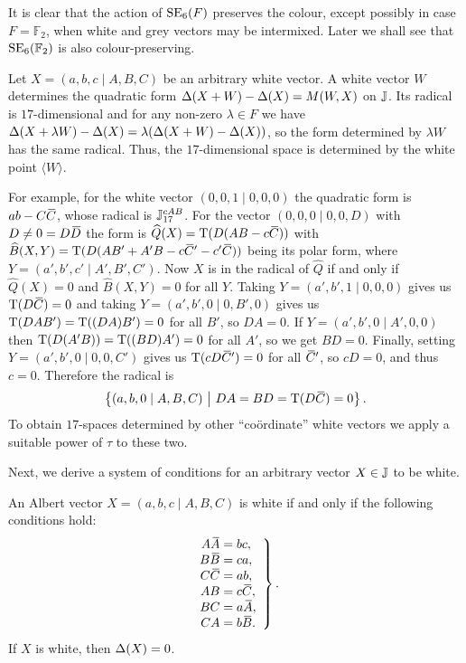 It is clear that the action of $\mathrm{SE}_6(F)$ preserves the colour, except possibly in case
$F = \mathbb{F}_2$, when white and grey vectors may be intermixed. 
Later we shall see that $\mathrm{SE}_6(\mathbb{F}_2)$ is also colour-preserving.

Let $X = (a,b,c\mid A,B,C)$ be an arbitrary white vector. 
A white vector $W$ determines the quadratic form $\Delta(X+W) - \Delta(X) = M(W,X)$ on $\mathbb{J}$. 
Its radical is $17$-dimensional and for any non-zero $\lambda \in F$ 
we have $\Delta(X+\lambda W) - \Delta(X) = \lambda( \Delta(X+W) - \Delta(X) )$, so 
the form determined by $\lambda W$ has the same radical. Thus, the $17$-dimensional
space is determined by the white point $\langle W \rangle$. 

For example, for the white vector $(0,0,1\mid 0,0,0)$ the quadratic form is 
$ab - C\mathord{\mbox{\hspace*{0pt}}\,\overline{\!C\!\!\;}\!\:}\mbox{\hspace*{0pt}}$, whose radical is $\mathbb{J}_{17}^{cAB}$. For the vector
$(0,0,0\mid 0,0,D)$ with $D \neq 0 = D\mathord{\mbox{\hspace*{0pt}}\,\overline{\!D\!\!\;}\!\:}\mbox{\hspace*{0pt}}$ the form is 
$\widehat{Q}(X) = \operatorname{T}( D (AB - c\mathord{\mbox{\hspace*{0pt}}\,\overline{\!C\!\!\;}\!\:}\mbox{\hspace*{0pt}}) )$ with
\mbox{$\hat{B}(X,Y) = \Tr( D ( AB' + A'B - c\ovC' - c'\ovC) )$} being its polar form,
where
$Y = (a',b',c'\mid A',B',C')$. Now $X$ is in the radical of $\hat{Q}$ if 
and only if $\hat{Q}(X) = 0$ and $\hat{B}(X,Y) = 0$ for all $Y$. 
Taking \mbox{$Y = (a',b',1\mid 0,0,0)$} gives us $\operatorname{T}(D\mathord{\mbox{\hspace*{0pt}}\,\overline{\!C\!\!\;}\!\:}\mbox{\hspace*{0pt}}) = 0$ and taking 
$Y = (a',b',0\mid 0,B',0)$ gives us \mbox{$\operatorname{T}(DAB' ) = \operatorname{T}((DA)B' ) = 0$}
for all $B'$, so $DA = 0$. If $Y = (a',b',0\mid A',0,0)$ then \mbox{$\operatorname{T}(D(A'B)) = \operatorname{T}((BD)A') = 0$} for all $A'$, so we get $BD = 0$. Finally, setting
$Y = (a',b',0\mid 0,0,C')$ gives us $\operatorname{T}(cD\mathord{\mbox{\hspace*{0pt}}\,\overline{\!C\!\!\;}\!\:}\mbox{\hspace*{0pt}}') = 0$ for all $\mathord{\mbox{\hspace*{0pt}}\,\overline{\!C\!\!\;}\!\:}\mbox{\hspace*{0pt}}'$, so
$cD = 0$, and thus $c = 0$. Therefore the radical is
\begin{equation}
	\label{eq:17_space}
	\left\{ (a,b,0 \mid A,B,C)\ \big|\ DA = BD = \operatorname{T}(D\mathord{\mbox{\hspace*{0pt}}\,\overline{\!C\!\!\;}\!\:}\mbox{\hspace*{0pt}}) = 0 \right\}.
\end{equation}
To obtain $17$-spaces determined by other ``co\"{o}rdinate'' white vectors we apply 
a suitable power of $\tau$ to these two. 

Next, we derive 
a system of conditions for an arbitrary vector $X \in \mathbb{J}$ to be white. 

\begin{lemma}
	An Albert vector $X = (a,b,c\mid A,B,C)$ is white if and only if the following 
	conditions hold:
	\begin{equation}
		\left.\begin{array}{r@{\;}c@{\;}l}
			A \ovA & = & bc, \\
			B \ovB & = & ca, \\
			C \ovC & = & ab, \\
			AB & = & c\ovC, \\
			BC & = & a\ovA, \\
			CA & = & b\ovB.
		\end{array}
		\right\}.
	\end{equation}
	If $X$ is white, then $\Delta(X) = 0$. 
\end{lemma}

